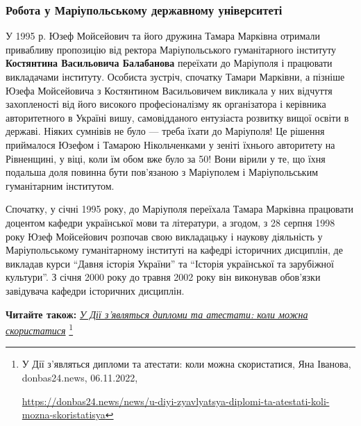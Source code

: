 
\subsubsection{Робота у Маріупольському державному університеті}

У 1995 р. Юзеф Мойсейович та його дружина Тамара Марківна отримали привабливу
пропозицію від ректора Маріупольського гуманітарного інституту \textbf{Костянтина
Васильовича Балабанова} переїхати до Маріуполя і працювати викладачами
інституту. Особиста зустріч, спочатку Тамари Марківни, а пізніше Юзефа
Мойсейовича з Костянтином Васильовичем викликала у них відчуття захопленості
від його високого професіоналізму як організатора і керівника авторитетного в
Україні вишу, самовідданого ентузіаста розвитку вищої освіти в державі. Ніяких
сумнівів не було — треба їхати до Маріуполя! Це рішення приймалося Юзефом і
Тамарою Нікольченками у зеніті їхнього авторитету на Рівненщині, у віці, коли
їм обом вже було за 50! Вони вірили у те, що їхня подальша доля повинна бути
пов'язаною з Маріуполем і Маріупольським гуманітарним інститутом.

Спочатку, у січні 1995 року, до Маріуполя переїхала Тамара Марківна працювати
доцентом кафедри української мови та літератури, а згодом, з 28 серпня 1998
року Юзеф Мойсейович розпочав свою викладацьку і наукову діяльність у
Маріупольському гуманітарному інституті на кафедрі історичних дисциплін, де
викладав курси \enquote{Давня історія України} та \enquote{Історія української та зарубіжної
культури}. З січня 2000 року до травня 2002 року він виконував обов'язки
завідувача кафедри історичних дисциплін.

\textbf{Читайте також:} \href{https://donbas24.news/news/u-diyi-zyavlyatsya-diplomi-ta-atestati-koli-mozna-skoristatisya}{\emph{У Дії з'являться дипломи та атестати: коли можна скористатися}}%
\footnote{У Дії з'являться дипломи та атестати: коли можна скористатися, Яна Іванова, donbas24.news, 06.11.2022, \par%
\url{https://donbas24.news/news/u-diyi-zyavlyatsya-diplomi-ta-atestati-koli-mozna-skoristatisya}%
}

